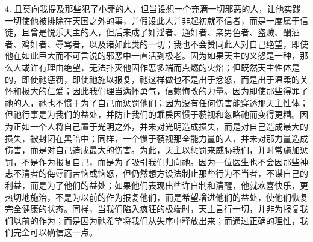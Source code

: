 4. 且莫向我提及那些犯了小罪的人，但当设想一个充满一切邪恶的人，让他实践一切使他被排除在天国之外的事，并假设此人并非起初就不信者，而是一度属于信徒，且曾是悦乐天主的人，但后来成了奸淫者、通奸者、亲男色者、盗贼、酗酒者、鸡奸者、辱骂者，以及诸如此类的一切；我也不会赞同此人对自己绝望，即使他在如此巨大而不可言说的邪恶中一直活到极老。因为如果天主的义怒是一种，那么人或许有理由绝望，无法扑灭他因作恶多端而点燃的火焰；但既然天主性体是的，即使祂惩罚，即使祂施以报复，祂这样做也不是出于忿怒，而是出于温柔的关怀和极大的仁爱；因此我们理当满怀勇气，信赖悔改的力量。因为即使那些得罪了祂的人，祂也不惯于为了自己而惩罚他们；因为没有任何伤害能穿透那天主性体；但祂行事是为我们的益处，并防止我们的乖戾因惯于藐视和忽略祂而变得更糟。因为正如一个人将自己置于光明之外，并未对光明造成损失，而是对自己造成最大的损失，被封闭在黑暗中；同样，一个惯于藐视那全能力量的人，并未对那力量造成伤害，而是对自己造成最大的伤害。为此，天主以惩罚来威胁我们，并时常施加惩罚，不是作为报复自己，而是为了吸引我们归向祂。因为一位医生也不会因那些神志不清者的侮辱而苦恼或恼怒，但仍然想方设法制止那些行为不当者，不谋自己的利益，而是为了他们的益处；如果他们表现出些许自制和清醒，他就欢喜快乐，更热切地施治，不是为以前的作为报复他们，而是希望增进他们的益处，使他们恢复完全健康的状态。同样，当我们陷入疯狂的极端时，天主言行一切，并非为报复我们以前的作为；而是因为祂希望将我们从失序中释放出来；而通过正确的理性，我们完全可以确信这一点。\par


